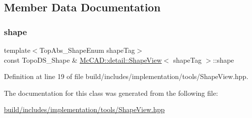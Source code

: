 \subsection{Member Data Documentation}
\mbox{\label{classMcCAD_1_1detail_1_1ShapeView_a1bb072976e70ad902ce623a53783c531}} 
\subsubsection{\texorpdfstring{shape}{shape}}
{\footnotesize\ttfamily template$<$Top\+Abs\+\_\+\+Shape\+Enum shape\+Tag$>$ \\
const Topo\+D\+S\+\_\+\+Shape \& \hyperlink{classMcCAD_1_1detail_1_1ShapeView}{Mc\+C\+A\+D\+::detail\+::\+Shape\+View}$<$ shape\+Tag $>$\+::shape\hspace{0.3cm}{\ttfamily [private]}}



Definition at line 19 of file build/includes/implementation/tools/\+Shape\+View.\+hpp.



The documentation for this class was generated from the following file\+:\begin{DoxyCompactItemize}
\item 
\hyperlink{build_2includes_2implementation_2tools_2ShapeView_8hpp}{build/includes/implementation/tools/\+Shape\+View.\+hpp}\end{DoxyCompactItemize}
